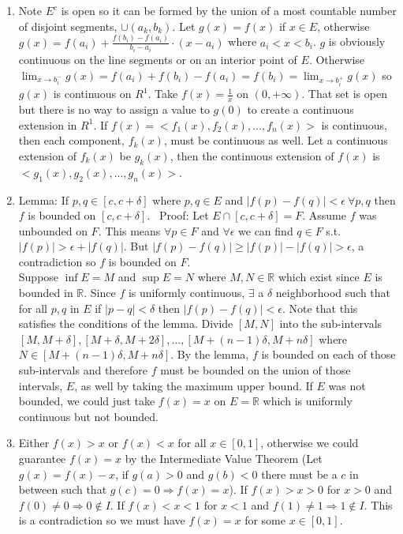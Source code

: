 \documentclass{article}
\begin{document}
\begin{enumerate}
\item Note $E^c$ is open so it can be formed by the union of a most countable number of disjoint segments, $\cup (a_k, b_k)$. Let $g(x)=f(x)$ if $x\in E$, otherwise $g(x) = f(a_i) + \frac{f(b_i) - f(a_i)}{b_i-a_i} \cdot (x-a_i)$ where $a_i < x < b_i$. $g$ is obviously continuous on the line segments or on an interior point of $E$. Otherwise $\displaystyle \lim_{x\rightarrow b_i^{-}} g(x) = f(a_i) + f(b_i) - f(a_i) = f(b_i)=\displaystyle \lim_{x\rightarrow b_i^{+}} g(x)$ so $g(x)$ is continuous on $R^1$. Take $f(x)=\frac{1}{x}$ on $(0,+\infty)$. That set is open but there is no way to assign a value to $g(0)$ to create a continuous extension in $R^1$. If $f(x)=<f_1 (x), f_2 (x), ... , f_n (x)>$ is continuous, then each component, $f_k (x)$, must be continuous as well. Let a continuous extension of $f_k (x)$ be $g_k (x)$, then the continuous extension of $f(x)$ is $<g_1 (x), g_2 (x), ... , g_n (x)>$. 
\setcounter{enumi}{7}
\item Lemma: If $p,q\in [c, c+\delta]$ where $p,q\in E$ and $|f(p)-f(q)| < \epsilon \ \forall p,q$ then $f$ is bounded on $[c, c+\delta]$. \
Proof: Let $E\cap [c, c+\delta] = F$. Assume $f$ was unbounded on $F$. This means $\forall p\in F$ and $\forall \epsilon$ we can find $q\in F$ s.t. $|f(p)| > \epsilon + |f(q)|$. But $|f(p)-f(q)| \geq |f(p)| - |f(q)| > \epsilon$, a contradiction so $f$ is bounded on $F$. \\
Suppose $\inf E = M$ and $\sup E = N$ where $M, N\in\mathbb{R}$ which exist since $E$ is bounded in $\mathbb{R}$. Since $f$ is uniformly continuous,  $\exists$ a $\delta$ neighborhood such that for all $p,q$ in $E$ if $|p-q| <\delta$ then $|f(p)-f(q)| < \epsilon$. Note that this satisfies the conditions of the lemma. Divide $[M, N]$ into the sub-intervals $[M, M+\delta], [M+\delta, M+2\delta], ..., [M+(n-1)\delta, M+n\delta]$ where $N\in [M+(n-1)\delta, M+n\delta]$. By the lemma, $f$ is bounded on each of those sub-intervals and therefore $f$ must be bounded on the union of those intervals, $E$, as well by taking the maximum upper bound. If $E$ was not bounded, we could just take $f(x)=x$ on $E=\mathbb{R}$ which is uniformly continuous but not bounded.
\setcounter{enumi}{13}
\item Either $f(x) > x$ or $f(x) <x$ for all $x\in [0,1]$, otherwise we could guarantee $f(x)=x$ by the Intermediate Value Theorem (Let $g(x) = f(x) - x$, if $g(a) > 0$ and $g(b) <0$ there must be a $c$ in between such that $g(c)=0\Rightarrow f(x)=x$). If $f(x) > x > 0$ for $x>0$ and $f(0) \neq 0 \Rightarrow 0\notin I$. If $f(x) < x < 1$ for $x<1$ and $f(1)\neq 1 \Rightarrow 1\notin I$. This is a contradiction so we must have $f(x)=x$ for some $x\in[0,1]$. \\

\end{enumerate}
\end{document}
